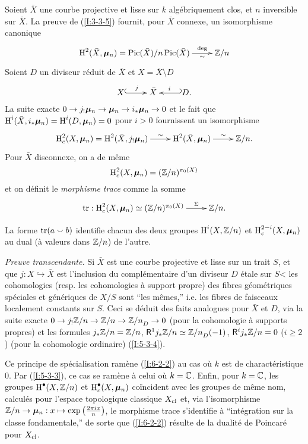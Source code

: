 \documentclass[oneside]{book}
\begin{document}
\subsubsection{}\label{I:6-2-1}

Soient $\bar X$ une courbe projective et lisse sur $k$ algébriquement clos, et 
$n$ inversible sur $\bar X$. La preuve de (\ref{I:3-3-5}) fournit, pour 
$\bar X$ connexe, un isomorphisme canonique 
\[\xymatrix{
  \h^2(\bar X,\dmu_n) = \pic(\bar X)/n\pic(\bar X) \ar[r]^-{\deg}_-{\sim}
    & \dZ/n
}\]
Soient $D$ un diviseur réduit de $\bar X$ et $X=\bar X\setminus D$ 
\[\xymatrix{
  X \ar@{^{(}->}[r]^-j 
    & \bar X 
    & \ar@{_{(}->}[l]_-i D \text{.}
}\]
La suite exacte $0\to j_! {\bm\mu}_n \to {\bm\mu}_n\to i_* {\bm\mu}_n\to 0$ et le fait que 
$\operatorname{H}^i(\bar X,i_*{\bm\mu}_n) = \operatorname{H}^i(D,{\bm\mu}_n)=0$ pour $i>0$ fournissent un 
isomorphisme 
\[\xymatrix{
  \h_c^2(X,\dmu_n) = \h^2(\bar X,j_! \dmu_n) \ar[r]^-\sim 
    & \h^2(\bar X,\dmu_n) \ar[r]^-\sim 
    & \dZ/n \text{.}
}\]
Pour $\bar X$ disconnexe, on a de même 
\[
  \operatorname{H}_c^2(X,{\bm\mu}_n) = (\mathbb{Z}/n)^{\pi_0(X)}
\]
et on définit le \emph{morphisme trace} comme la somme 
\[\xymatrix{
  \tr : \h_c^2(X,\dmu_n) \simeq (\dZ/n)^{\pi_0(X)} \ar[r]^-\Sigma
    & \dZ/n\text{.}
}\]





\begin{theorem}\label{I:6-2-2}
La forme $\operatorname{tr}(a\smallsmile b)$ identifie chacun des deux groupes $\operatorname{H}^i(X,\mathbb{Z}/n)$ 
et $\operatorname{H}_c^{2-i}(X,{\bm\mu}_n)$ au dual (à valeurs dans $\mathbb{Z}/n$) de l'autre. 
\end{theorem}

\emph{Preuve transcendante.} Si $\bar X$ est une courbe projective et lisse sur 
un trait $S$, et que $j:X\hookrightarrow \bar X$ est l'inclusion du 
complémentaire d'un diviseur $D$ étale sur $S$< les cohomologies (resp. 
les cohomologies à support propre) des fibres géométriques spéciales et 
génériques de $X/S$ sont ``les mêmes,'' i.e. les fibres de faisceaux 
localement constants sur $S$. Ceci se déduit des faits analogues pour 
$\bar X$ et $D$, via la suite exacte $0\to j_! \mathbb{Z}/n\to\mathbb{Z}/n\to {\mathbb{Z}/n}_D\to 0$ 
(pour la cohomologie à supports propres) et les formules $j_*\mathbb{Z}/n = \mathbb{Z}/n$, 
$\mathsf{R}^1 j_* \mathbb{Z}/n \simeq {\mathbb{Z}/n}_D(-1)$, $\mathsf{R}^i j_*\mathbb{Z}/n = 0$ ($i\geqslant 2$) 
(pour la cohomologie ordinaire) (\ref{I:5-3-4}). 

Ce principe de spécialisation ramène (\ref{I:6-2-2}) au cas où $k$ est de 
charactéristique $0$. Par (\ref{I:5-3-3}), ce cas se ramène à celui où 
$k=\mathbb{C}$. Enfin, pour $k=\mathbb{C}$, les groupes $\operatorname{H}^\bullet(X,\mathbb{Z}/n)$ et 
$\operatorname{H}_c^\bullet(X,{\bm\mu}_n)$ coïncident avec les groupes de même nom, calculés 
pour l'espace topologique classique $X_{\textnormal{cl}}$ et, via 
l'isomorphisme $\mathbb{Z}/n\to {\bm\mu}_n: x\mapsto \exp\left(\frac{2\pi i x}{n}\right)$, 
le morphisme trace s'identifie à ``intégration sur la classe fondamentale,'' 
de sorte que (\ref{I:6-2-2}) résulte de la dualité de Poincaré pour 
$X_{\textnormal{cl}}$. 
\end{document}
